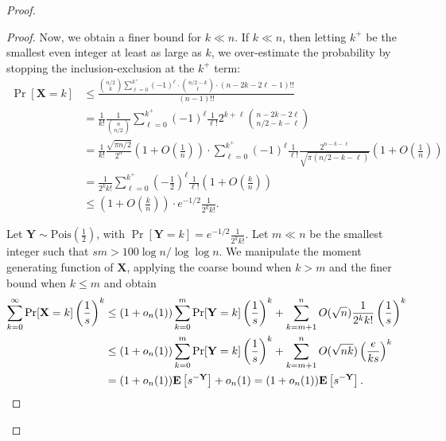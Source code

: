 \documentclass[11pt]{article}
\newcommand{\e}{{\mathbf E}}
\newcommand{\bX}{\mathbf{X}}
\newcommand{\bY}{\mathbf{Y}}
\numberwithin{equation}{section}
\numberwithin{thm}{section}
\begin{document}
\begin{proof}
\begin{proof}
Now, we obtain a finer bound for $k\ll n$.
If $k \ll n$, then letting $k^+$ be the smallest even integer at least as large as $k$, we over-estimate the probability by stopping the inclusion-exclusion at the $k^+$ term:
\begin{align*}
\Pr[\bX = k]
&\le \frac{\binom{n/2}{k}\sum_{\ell=0}^{k^+} (-1)^\ell \cdot\binom{n/2 - k}{\ell} \cdot (n-2k - 2\ell-1)!!}{(n-1)!!}\\
&= \frac{1}{k!} \frac{1}{\binom{n}{n/2}} \sum_{\ell=0}^{k^+} (-1)^\ell \frac{1}{\ell!} 2^{k+\ell} \binom{n-2k-2\ell}{n/2-k-\ell}\\
&= \frac{1}{k!} \frac{\sqrt{\pi n/2}}{2^{n}}\left(1+O(\tfrac{1}{n})\right) \cdot \sum_{\ell=0}^{k^+} (-1)^\ell \frac{1}{\ell!} \frac{2^{n-k-\ell}}{\sqrt{\pi(n/2-k-\ell)}}\left(1+O(\tfrac{1}{n})\right)\\
&= \frac{1}{2^k k!} \sum_{\ell=0}^{k^+} \left(-\frac{1}{2}\right)^\ell \frac{1}{\ell!}\left(1+O(\tfrac{k}{n})\right)\\
&\leq \left(1 + O(\tfrac{k}{n})\right) \cdot e^{-1/2} \frac{1}{2^k k!}.
\end{align*}

Let $\bY \sim \mathrm{Pois}(\frac{1}{2})$, with $\Pr[\bY = k] = e^{-1/2} \frac{1}{2^k k!}$.
Let $m \ll n$ be the smallest integer such that $s m > 100 \log n / \log\log n$.
We manipulate the moment generating function of $\bX$, applying the coarse bound when $k > m$ and the finer bound when $k \le m$ and obtain
\begin{align*}
    \sum_{k=0}^\infty \Pr[\bX = k] \left(\frac{1}{s}\right)^k
    &\le (1+o_n(1))\sum_{k=0}^{m} \Pr[\bY = k] \left(\frac{1}{s}\right)^k + \sum_{k=m+1}^n O(\sqrt{n})\frac{1}{2^k k!} \left(\frac{1}{s}\right)^k\\
    &\le (1+o_n(1))\sum_{k=0}^{m} \Pr[\bY = k] \left(\frac{1}{s}\right)^k + \sum_{k=m+1}^n  O(\sqrt{n k})\left(\frac{e}{k s}\right)^k\\
    &= (1+o_n(1)) \e\left[s^{-\bY}\right] + o_n(1)
    = (1+o_n(1))\e\left[s^{-\bY}\right]. \qedhere
\end{align*}
\end{proof}



\end{proof}
\end{document}
